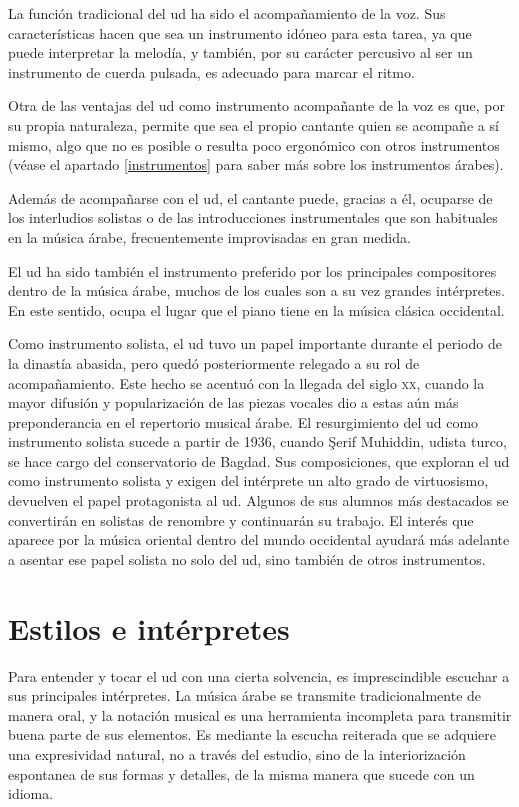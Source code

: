 La función tradicional del ud ha sido el acompañamiento de la voz. Sus características hacen que sea un instrumento idóneo para esta tarea, ya que puede interpretar la melodía, y también, por su carácter percusivo al ser un instrumento de cuerda pulsada, es adecuado para marcar el ritmo.

Otra de las ventajas del ud como instrumento acompañante de la voz es que, por su propia naturaleza, permite que sea el propio cantante quien se acompañe a sí mismo, algo que no es posible o resulta poco ergonómico con otros instrumentos (véase el apartado \ref{instrumentos} para saber más sobre los instrumentos árabes).

Además de acompañarse con el ud, el cantante puede, gracias a él, ocuparse de los interludios solistas o de las introducciones instrumentales que son habituales en la música árabe, frecuentemente improvisadas en gran medida.

El ud ha sido también el instrumento preferido por los principales compositores dentro de la música árabe, muchos de los cuales son a su vez grandes intérpretes. En este sentido, ocupa el lugar que el piano tiene en la música clásica occidental.

Como instrumento solista, el ud tuvo un papel importante durante el periodo de la dinastía abasida, pero quedó posteriormente relegado a su rol de acompañamiento. Este hecho se acentuó con la llegada del siglo \textsc{xx}, cuando la mayor difusión y popularización de las piezas vocales dio a estas aún más preponderancia en el repertorio musical árabe. El resurgimiento del ud como instrumento solista sucede a partir de 1936, cuando Şerif Muhiddin, udista turco, se hace cargo del conservatorio de Bagdad. Sus composiciones, que exploran el ud como instrumento solista y exigen del intérprete un alto grado de virtuosismo, devuelven el papel protagonista al ud. Algunos de sus alumnos más destacados se convertirán en solistas de renombre y continuarán su trabajo. El interés que aparece por la música oriental dentro del mundo occidental ayudará más adelante a asentar ese papel solista no solo del ud, sino también de otros instrumentos.

\section{Estilos e intérpretes}
\label{estilos}

Para entender y tocar el ud con una cierta solvencia, es imprescindible escuchar a sus principales intérpretes. La música árabe se transmite tradicionalmente de manera oral, y la notación musical es una herramienta incompleta para transmitir buena parte de sus elementos. Es mediante la escucha reiterada que se adquiere una expresividad natural, no a través del estudio, sino de la interiorización espontanea de sus formas y detalles, de la misma manera que sucede con un idioma.

